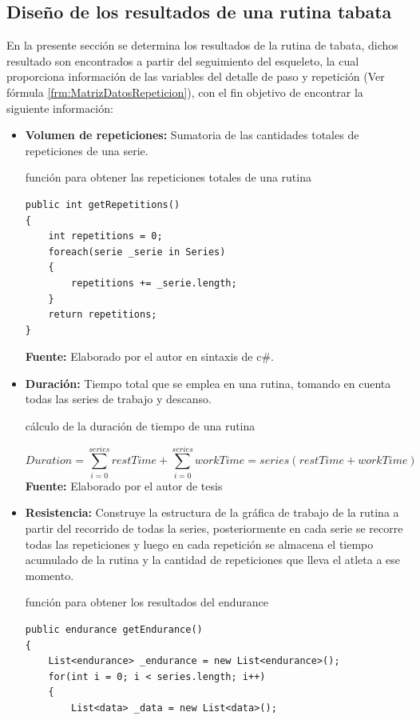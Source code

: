 \subsection{Dise\~no de los resultados de una rutina tabata} \label{dis:results}
En la presente secci\'on se determina los resultados de la rutina de tabata, dichos resultado son encontrados a partir del seguimiento del esqueleto, la cual proporciona informaci\'on de las variables del detalle de paso y repetici\'on (Ver f\'ormula \ref{frm:MatrizDatosRepeticion}), con el fin objetivo de encontrar la siguiente informaci\'on:
\begin{itemize}
\item \textbf{Volumen de repeticiones:} Sumatoria de las cantidades totales de repeticiones de una serie.  
\begin{code}[H]
	\caption{funci\'on para obtener las repeticiones totales de una rutina}
	\label{code:getRepetitions}
	\begin{lstlisting}
public int getRepetitions()
{
	int repetitions = 0;
	foreach(serie _serie in Series)
	{
		repetitions += _serie.length;
	}
	return repetitions;
}
	\end{lstlisting}
	\textbf{Fuente:} Elaborado por el autor en sintaxis de c\#.
\end{code}

\item \textbf{Duraci\'on:} Tiempo total que se emplea en una rutina, tomando en cuenta todas las series de trabajo y descanso.
\begin{formula}[H]
	\centering
	\caption{c\'alculo de la duraci\'on de tiempo de una rutina}
	\label{eq:DurationTime}
	\begin{equation}
	Duration = \sum_{i=0}^{series}restTime +\sum_{i=0}^{series}workTime = series(restTime+workTime)
	\end{equation}
		\textbf{Fuente:} Elaborado por el autor de tesis
\end{formula}
\item \textbf{Resistencia:} Construye la estructura de la gr\'afica de trabajo de la rutina a partir del recorrido de todas la series, posteriormente en cada serie se recorre todas las repeticiones y luego en cada repetici\'on se almacena el tiempo acumulado de la rutina y la cantidad de repeticiones que lleva el atleta a ese momento.
\begin{code}[H]
	\caption{funci\'on para obtener los resultados del endurance}
	\label{code:getEndurance}
	\begin{lstlisting}
public endurance getEndurance()
{
	List<endurance> _endurance = new List<endurance>();
	for(int i = 0; i < series.length; i++)
	{
		List<data> _data = new List<data>();
		

\end{lstlisting}
\end{code}
\end{itemize}
